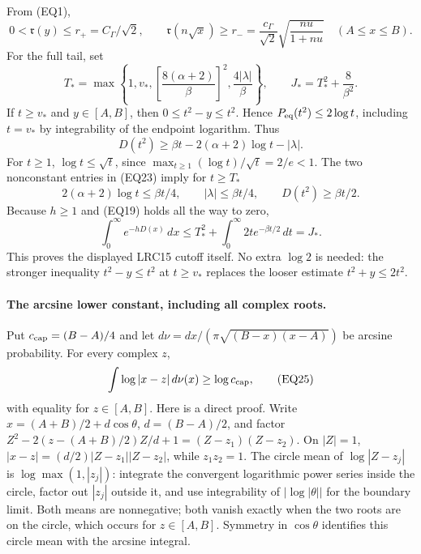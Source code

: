 \documentclass[11pt,a4paper]{article}
\begin{document}
From (EQ1),
\[
 0<{\mathfrak r}(y)\le r_+=C_\Gamma/\sqrt2,\qquad
 {\mathfrak r}(n\sqrt x)\ge r_-=
 \frac{c_\Gamma}{\sqrt2}\sqrt{\frac{nu}{1+nu}}
 \quad(A\le x\le B).
\tag{EQ22}
\]
For the full tail, set
\[
 T_*=\max\left\{1,v_*,
 \left[\frac{8(\alpha+2)}{\beta}\right]^2,
 \frac{4|\lambda|}{\beta}\right\},\qquad
 J_*=T_*^2+\frac8{\beta^2}.
\tag{EQ23}
\]
If \(t\ge v_*\) and \(y\in[A,B]\), then
\(0\le t^2-y\le t^2\).  Hence \(P_{\rm eq}(t^2)\le2\log t\),
including \(t=v_*\) by integrability of the endpoint logarithm.
Thus
\[
 D(t^2)\ge\beta t-2(\alpha+2)\log t-|\lambda|.
\]
For \(t\ge1\), \(\log t\le\sqrt t\), since
\(\max_{t\ge1}(\log t)/\sqrt t=2/e<1\).
The two nonconstant entries in (EQ23) imply for \(t\ge T_*\)
\[
 2(\alpha+2)\log t\le\beta t/4,\qquad
 |\lambda|\le\beta t/4,\qquad D(t^2)\ge\beta t/2 .
\]
Because \(h\ge1\) and (EQ19) holds all the way to zero,
\[
 \int_0^\infty e^{-hD(x)}\,dx
 \le T_*^2+\int_0^\infty2t e^{-\beta t/2}\,dt
 =J_* .
\tag{EQ24}
\]
This proves the displayed LRC15 cutoff itself.  No extra \(\log2\) is
needed: the stronger inequality \(t^2-y\le t^2\) at \(t\ge v_*\)
replaces the looser estimate \(t^2+y\le2t^2\).

\paragraph{The arcsine lower constant, including all complex roots.}
Put \(c_{\rm cap}=(B-A)/4\) and let
\(d\nu=dx/(\pi\sqrt{(B-x)(x-A)})\) be arcsine probability.
For every complex \(z\),
\[
 \int\log|x-z|\,d\nu(x)\ge\log c_{\rm cap},
\tag{EQ25}
\]
with equality for \(z\in[A,B]\).
Here is a direct proof.  Write \(x=(A+B)/2+d\cos\theta\),
\(d=(B-A)/2\), and factor
\(Z^2-2(z-(A+B)/2)Z/d+1=(Z-z_1)(Z-z_2)\).
On \(|Z|=1\),
\(|x-z|=(d/2)|Z-z_1||Z-z_2|\), while \(z_1z_2=1\).
The circle mean of \(\log|Z-z_j|\) is
\(\log\max(1,|z_j|)\): integrate the convergent logarithmic power
series inside the circle, factor out \(|z_j|\) outside it, and use
integrability of \(|\log|\theta||\) for the boundary limit.
Both means are nonnegative; both vanish exactly when the two roots
are on the circle, which occurs for \(z\in[A,B]\).  Symmetry in
\(\cos\theta\) identifies this circle mean with the arcsine integral.
\end{document}
